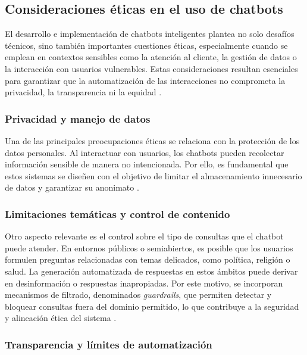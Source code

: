 \subsection{Consideraciones éticas en el uso de chatbots}

El desarrollo e implementación de chatbots inteligentes plantea no solo desafíos técnicos, sino también importantes cuestiones éticas, especialmente cuando se emplean en contextos sensibles como la atención al cliente, la gestión de datos o la interacción con usuarios vulnerables. Estas consideraciones resultan esenciales para garantizar que la automatización de las interacciones no comprometa la privacidad, la transparencia ni la equidad \cite{partnership-on-ai}.

\subsubsection{Privacidad y manejo de datos}

Una de las principales preocupaciones éticas se relaciona con la protección de los datos personales. Al interactuar con usuarios, los chatbots pueden recolectar información sensible de manera no intencionada. Por ello, es fundamental que estos sistemas se diseñen con el objetivo de limitar el almacenamiento innecesario de datos y garantizar su anonimato \cite{ico-ai-data-protection}.

\subsubsection{Limitaciones temáticas y control de contenido}

Otro aspecto relevante es el control sobre el tipo de consultas que el chatbot puede atender. En entornos públicos o semiabiertos, es posible que los usuarios formulen preguntas relacionadas con temas delicados, como política, religión o salud. La generación automatizada de respuestas en estos ámbitos puede derivar en desinformación o respuestas inapropiadas. Por este motivo, se incorporan mecanismos de filtrado, denominados \emph{guardrails}, que permiten detectar y bloquear consultas fuera del dominio permitido, lo que contribuye a la seguridad y alineación ética del sistema \cite{nvidia-guardrails-ai}.

\newpage
\subsubsection{Transparencia y límites de automatización}

